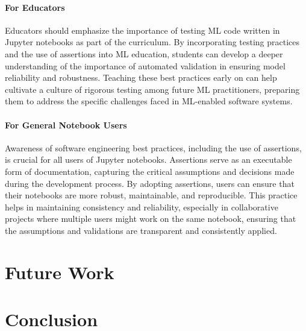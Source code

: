 \paragraph{\textbf{For Educators}} Educators should emphasize the importance of testing ML code written in Jupyter notebooks as part of the curriculum. By incorporating testing practices and the use of assertions into ML education, students can develop a deeper understanding of the importance of automated validation in ensuring model reliability and robustness. Teaching these best practices early on can help cultivate a culture of rigorous testing among future ML practitioners, preparing them to address the specific challenges faced in ML-enabled software systems.

\paragraph{\textbf{For General Notebook Users}} Awareness of software engineering best practices, including the use of assertions, is crucial for all users of Jupyter notebooks. Assertions serve as an executable form of documentation, capturing the critical assumptions and decisions made during the development process. By adopting assertions, users can ensure that their notebooks are more robust, maintainable, and reproducible. This practice helps in maintaining consistency and reliability, especially in collaborative projects where multiple users might work on the same notebook, ensuring that the assumptions and validations are transparent and consistently applied.

\section{Future Work}

\section{Conclusion}





